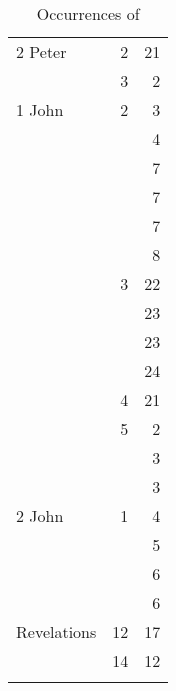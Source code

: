 \documentclass{article}
\newcommand{\entole}{\textepsilon\textnu\texttau\textomikron\textlambda\textepsilon\xspace}
\begin{document}
\begin{longtable}{lrr}
    2 Peter&2&21\\
    &3&2\\
    1 John&2&3\\
    & &4\\
    & &7\\
    & &7\\
    & &7\\
    & &8\\
    &3&22\\
    & &23\\
    & &23\\
    & &24\\
    &4&21\\
    &5&2\\
    & &3\\
    & &3\\
    2 John&1&4\\
    & &5\\
    & &6\\
    & &6\\
    Revelations&12&17\\
    &14&12\\
    \bottomrule
    \caption{Occurrences of \entole}
    \label{occurences}
\end{longtable}
\end{document}
